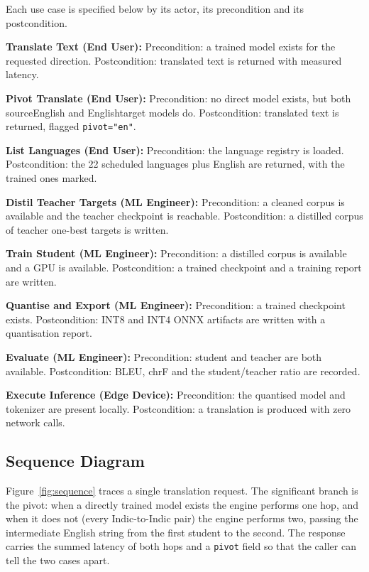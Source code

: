 Each use case is specified below by its actor, its precondition and its
postcondition.

\begin{bullets}
\item \textbf{Translate Text (End User):} Precondition: a trained model exists for the requested direction. Postcondition: translated text is returned with measured latency.
\item \textbf{Pivot Translate (End User):} Precondition: no direct model exists, but both source\arrowto{}English and English\arrowto{}target models do. Postcondition: translated text is returned, flagged \texttt{pivot="en"}.
\item \textbf{List Languages (End User):} Precondition: the language registry is loaded. Postcondition: the 22 scheduled languages plus English are returned, with the trained ones marked.
\item \textbf{Distil Teacher Targets (ML Engineer):} Precondition: a cleaned corpus is available and the teacher checkpoint is reachable. Postcondition: a distilled corpus of teacher one-best targets is written.
\item \textbf{Train Student (ML Engineer):} Precondition: a distilled corpus is available and a GPU is available. Postcondition: a trained checkpoint and a training report are written.
\item \textbf{Quantise and Export (ML Engineer):} Precondition: a trained checkpoint exists. Postcondition: INT8 and INT4 ONNX artifacts are written with a quantisation report.
\item \textbf{Evaluate (ML Engineer):} Precondition: student and teacher are both available. Postcondition: BLEU, chrF and the student/teacher ratio are recorded.
\item \textbf{Execute Inference (Edge Device):} Precondition: the quantised model and tokenizer are present locally. Postcondition: a translation is produced with zero network calls.
\end{bullets}

\subsection{Sequence Diagram}
\label{subsec:sequence}

Figure~\ref{fig:sequence} traces a single translation request. The significant
branch is the pivot: when a directly trained model exists the engine performs
one hop, and when it does not (every Indic-to-Indic pair) the engine
performs two, passing the intermediate English string from the first student to
the second. The response carries the summed latency of both hops and a
\texttt{pivot} field so that the caller can tell the two cases apart.


